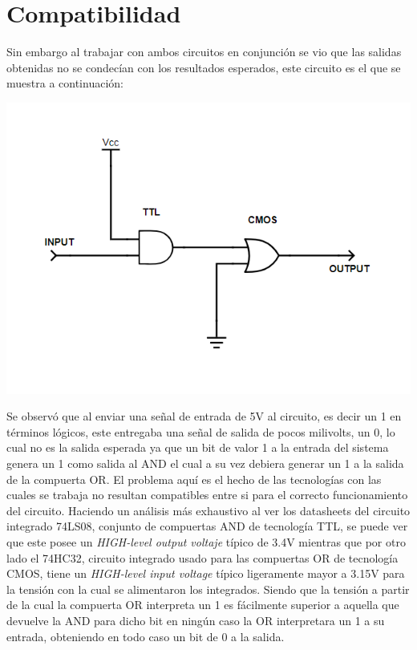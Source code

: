 \section{Compatibilidad}
Sin embargo al trabajar con ambos circuitos en conjunción se vio que las salidas obtenidas no se condecían con los resultados esperados, este circuito es el que se muestra a continuación:
\begin{center}
\includegraphics[scale = 0.8,keepaspectratio]{../5-TTL&CMOS/E3-ej5-defectuoso.png}
\end{center}
Se observó que al enviar una señal de entrada de 5V al circuito, es decir un 1 en términos lógicos, este entregaba una señal de salida de pocos milivolts, un 0, lo cual no es la salida esperada ya que un bit de valor 1 a la entrada del sistema genera un 1 como salida al AND el cual a su vez debiera generar un 1 a la salida de la compuerta OR.
El problema aquí es el hecho de las tecnologías con las cuales se trabaja no resultan compatibles entre si para el correcto funcionamiento del circuito. Haciendo un análisis más exhaustivo al ver los datasheets del circuito integrado 74LS08, conjunto de compuertas AND de tecnología TTL, se puede ver que este posee un \textit{HIGH-level output voltaje} típico de 3.4V mientras que por otro lado el 74HC32, circuito integrado usado para las compuertas OR de tecnología CMOS, tiene un \textit{HIGH-level input voltage} típico ligeramente mayor a 3.15V para la tensión con la cual se alimentaron los integrados. Siendo que la tensión a partir de la cual la compuerta OR interpreta un 1 es fácilmente superior a aquella que devuelve la AND para dicho bit en ningún caso la OR interpretara un 1 a su entrada, obteniendo en todo caso un bit de 0 a la salida.
